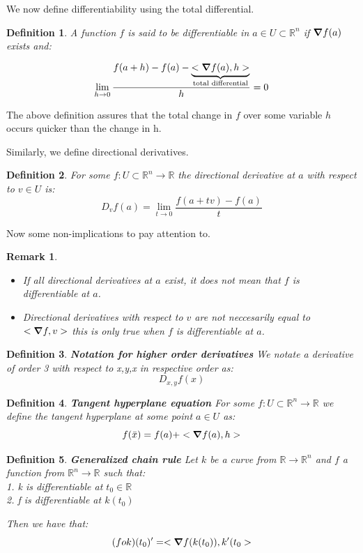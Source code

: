 \documentclass[titlepage]{article}
\newtheorem{remark}{Remark}[section]
\newtheorem{definition}{Definition}
\newcommand{\Rn}{\mathbb{R}^n}
\begin{document}
We now define differentiability using the total differential. 

\begin{definition}
A function $f$ is said to be differentiable in $a \in U \subset \Rn$ if $\grad f(a)$ exists and:

$$\lim_{h \to 0} \frac{f(a+h) - f(a) - \underbrace{<\grad f(a),h>}_{\text{total differential}}}{h} = 0$$
\end{definition}

The above definition assures that the total change in $f$ over some variable $h$ occurs quicker than the change in h. 


Similarly, we define directional derivatives.

\begin{definition}
For some $f:U\subset \Rn \to \mathbb{R}$ the directional derivative at $a$ with respect to $v \in U$ is:
$$D_{v}f(a) = \lim_{t \to 0}\frac{f(a+tv)-f(a)}{t}$$
\end{definition}

Now some non-implications to pay attention to.

\begin{remark} 
\\
\begin{itemize}
    \item If all directional derivatives at $a$ exist, it does not mean that $f$ is differentiable at $a$.
    \item Directional derivatives with respect to $v$ are not neccesarily equal to $<\grad f,v>$ this is only true when $f$ is differentiable at $a$.  
\end{itemize}
\end{remark}

\begin{definition} \textbf{Notation for higher order derivatives}
We notate a derivative of order 3 with respect to x,y,x in respective order as:
$$D_{x,y}f(x)$$
\end{definition}

\begin{definition} \textbf{Tangent hyperplane equation}
For some $f:U\subset \Rn \to \mathbb{R}$ we define the tangent hyperplane at some point $a \in U$ as:
$$f(\bar{x}) = f(a) + <\grad f(a), h>$$
\end{definition}

\begin{definition}\textbf{Generalized chain rule}
Let $k$ be a curve from $\mathbb{R} \to \Rn$ and $f$ a function from $\Rn \to \mathbb{R}$ such that:
\\
1. k is differentiable at $t_{0} \in \mathbb{R}$
\\
2. f is differentiable at $k(t_{0})$

Then we have that:
$$(fok)(t_{0})^{\prime} = <\grad f(k(t_{0})), k^{\prime}(t_{0}>$$
\end{definition}
\end{document}
